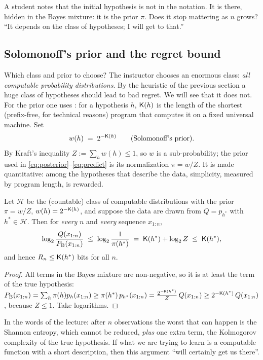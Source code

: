 \begin{discussion}
A student notes that the initial hypothesis is not in the notation. It is there, hidden in the Bayes mixture: it is the prior $\pi$. Does it stop mattering as $n$ grows? ``It depends on the class of hypotheses; I will get to that.''
\end{discussion}

\subsection{Solomonoff's prior and the regret bound}\label{sec:L3-solomonoff}
Which class and prior to choose? The instructor chooses an enormous class: \emph{all computable probability distributions}. By the heuristic of the previous section a huge class of hypotheses should lead to bad regret. We will see that it does not.
For the prior one uses : for a hypothesis $h$, $\mathsf{K}(h)$ is the length of the shortest (prefix-free, for technical reasons) program that computes it on a fixed universal machine. Set
\[
   w(h)\;=\;2^{-\mathsf{K}(h)}\qquad(\text{Solomonoff's prior}).
\]
By Kraft's inequality $Z:=\sum_hw(h)\le1$, so $w$ is a sub-probability; the prior used in \eqref{eq:posterior}--\eqref{eq:predict} is its normalization $\pi=w/Z$. It is  made quantitative: among the hypotheses that describe the data, simplicity, measured by program length, is rewarded.

\begin{thm}\label{thm:solomonoff}
Let $\mathcal H$ be the (countable) class of computable distributions with the prior $\pi=w/Z$, $w(h)=2^{-\mathsf{K}(h)}$, and suppose the data are drawn from $Q=p_{h^*}$ with $h^*\in\mathcal H$. Then for \emph{every} $n$ and \emph{every} sequence $x_{1:n}$,
\[
   \log_2\frac{Q(x_{1:n})}{P_{\mathrm{B}}(x_{1:n})}\;\le\;\log_2\frac1{\pi(h^*)}\;=\;\mathsf{K}(h^*)+\log_2Z\;\le\;\mathsf{K}(h^*),
\]
and hence $R_n\le\mathsf{K}(h^*)$ bits for all $n$.
\end{thm}
\begin{proof}
All terms in the Bayes mixture are non-negative, so it is at least the term of the true hypothesis: $P_{\mathrm{B}}(x_{1:n})=\sum_h\pi(h)p_h(x_{1:n})\ge\pi(h^*)\,p_{h^*}(x_{1:n})=\frac{2^{-\mathsf{K}(h^*)}}{Z}\,Q(x_{1:n})\ge2^{-\mathsf{K}(h^*)}\,Q(x_{1:n})$, because $Z\le1$. Take logarithms.
\end{proof}
\noindent In the words of the lecture: after $n$ observations the worst that can happen is the Shannon entropy, which cannot be reduced, \emph{plus} one extra term, the Kolmogorov complexity of the true hypothesis. If what we are trying to learn is a computable function with a short description, then this argument ``will certainly get us there''.

